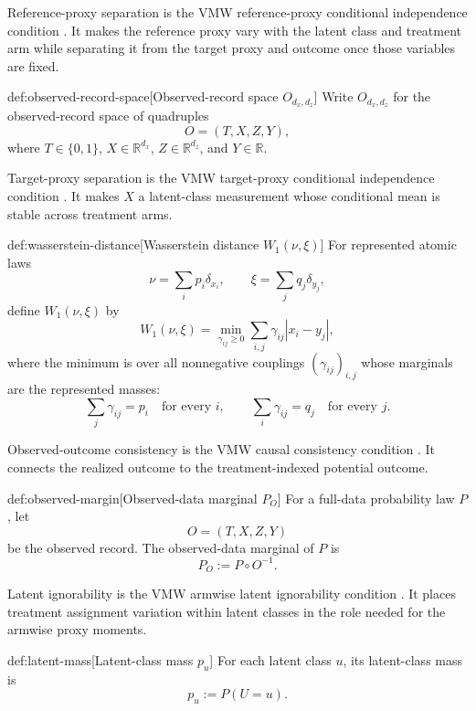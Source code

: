 \documentclass[11pt]{article}
\begin{document}
Reference-proxy separation is the VMW reference-proxy conditional independence condition \citep{VirkMazaheriWu2026}. It makes the reference proxy vary with the latent class and treatment arm while separating it from the target proxy and outcome once those variables are fixed.

\begin{definitionv}{def:observed-record-space}[Observed-record space \(O_{d_x,d_z}\)]
Write \(O_{d_x,d_z}\) for the observed-record space of quadruples
\[
O=(T,X,Z,Y),
\]
where \(T\in\{0,1\}\), \(X\in\mathbb R^{d_x}\), \(Z\in\mathbb R^{d_z}\), and \(Y\in\mathbb R\).
\end{definitionv}

Target-proxy separation is the VMW target-proxy conditional independence condition \citep{VirkMazaheriWu2026}. It makes \(X\) a latent-class measurement whose conditional mean is stable across treatment arms.

\begin{definitionv}{def:wasserstein-distance}[Wasserstein distance \(W_1(\nu,\xi)\)]
For represented atomic laws
\[
\nu=\sum_i p_i\delta_{x_i},
\qquad
\xi=\sum_j q_j\delta_{y_j},
\]
define \(W_1(\nu,\xi)\) by
\[
W_1(\nu,\xi)
=
\min_{\gamma_{ij}\ge 0}
\sum_{i,j}\gamma_{ij}|x_i-y_j|,
\]
where the minimum is over all nonnegative couplings \((\gamma_{ij})_{i,j}\) whose marginals are the represented masses:
\[
\sum_j \gamma_{ij}=p_i
\quad\text{for every }i,
\qquad
\sum_i \gamma_{ij}=q_j
\quad\text{for every }j.
\]
\end{definitionv}

Observed-outcome consistency is the VMW causal consistency condition \citep{VirkMazaheriWu2026}. It connects the realized outcome to the treatment-indexed potential outcome.

\begin{definitionv}{def:observed-margin}[Observed-data marginal \(P_O\)]
For a full-data probability law \(P\), let
\[
O=(T,X,Z,Y)
\]
be the observed record. The observed-data marginal of \(P\) is
\[
P_O:=P\circ O^{-1}.
\]
\end{definitionv}

Latent ignorability is the VMW armwise latent ignorability condition \citep{VirkMazaheriWu2026}. It places treatment assignment variation within latent classes in the role needed for the armwise proxy moments.

\begin{definitionv}{def:latent-mass}[Latent-class mass \(p_u\)]
For each latent class \(u\), its latent-class mass is
\[
p_u:=P(U=u).
\]
\end{definitionv}
\end{document}
